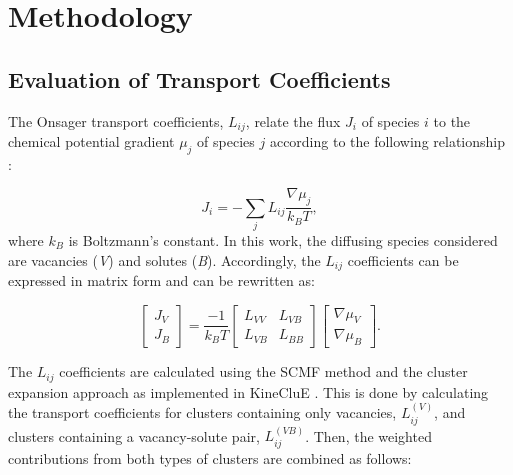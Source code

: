 \documentclass[preprint,12pt]{elsarticle}
\begin{document}


\FloatBarrier
\section{Methodology}
\FloatBarrier
\subsection{Evaluation of Transport Coefficients}

\noindent The Onsager transport coefficients, $L_{ij}$, relate the flux $J_i$ of species $i$ to the chemical potential gradient $\mu_j$ of species $j$ according to the following relationship \cite{allnatt_atomic_2003}:

\begin{equation}
   J_i = -\sum_j{L_{ij} \frac{\nabla\mu_j}{k_B T}} ,
\label{eq_onsager}
\end{equation}
where $k_B$ is Boltzmann's constant. In this work, the diffusing species considered are vacancies (\textit{V}) and solutes (\textit{B}). Accordingly, the $L_{ij}$ coefficients can be expressed in matrix form and  can be rewritten as:

\begin{equation}
\label{matrix_form_onsager}
    \begin{bmatrix}
        J_V \\
        J_B 
    \end{bmatrix}=\frac{-1}{k_B T}
    \begin{bmatrix}
    L_{VV} & L_{VB} \\
    L_{VB} & L_{BB}
    \end{bmatrix}
        \begin{bmatrix}
        \nabla\mu_V \\
        \nabla\mu_B
    \end{bmatrix}.
\end{equation}

\noindent The $L_{ij}$ coefficients are calculated using the SCMF method \cite{nastar_self-consistent_2000, nastar_mean_2005} and the cluster expansion approach as implemented in KineCluE \cite{schuler_kineclue_2020}. This is done by calculating the transport coefficients for clusters containing only vacancies, $L_{ij}^{(V)}$, and clusters containing a vacancy-solute pair, $L_{ij}^{(VB)}$. Then, the weighted contributions from both types of clusters are combined as follows:
\end{document}
